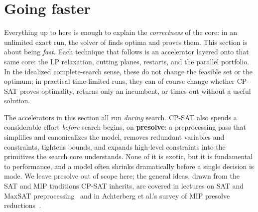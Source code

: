 \section{Going faster}\label{part:faster}

Everything up to here is enough to explain the \emph{correctness} of the core:
in an unlimited exact run, the solver of 
finds optima and proves them. This section is about being \emph{fast}. Each
technique that follows is an accelerator layered onto that same core: the LP
relaxation, cutting planes, restarts, and the parallel portfolio. In the idealized complete-search sense, these do not change the
feasible set or the optimum; in practical time-limited runs, they can of course
change whether CP-SAT proves optimality, returns only an incumbent, or times out
without a useful solution.

\begin{platypusbook}[htb]
The accelerators in this section all run \emph{during} search. CP-SAT also spends
a considerable effort \emph{before} search begins, on \textbf{presolve}: a
preprocessing pass that simplifies and canonicalizes the model, removes
redundant variables and constraints, tightens bounds, and expands high-level
constraints into the primitives the search core understands. None of it is
exotic, but it is fundamental to performance, and a model often shrinks
dramatically before a single decision is made. We leave presolve out of scope
here; the general ideas, drawn from the SAT and MIP traditions CP-SAT inherits,
are covered in lectures on SAT and MaxSAT
preprocessing~\cite{preprocsat,preprocmaxsat} and in Achterberg et al.'s survey
of MIP presolve reductions~\cite{achterberg2016presolve}.
\end{platypusbook}

